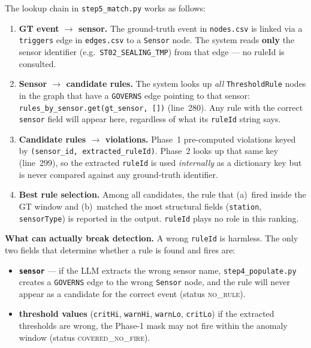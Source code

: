 ﻿\documentclass[11pt]{article}
\begin{document}
The lookup chain in \texttt{step5\_match.py} works as follows:
\begin{enumerate}[leftmargin=1.5em,itemsep=2pt]

  \item \textbf{GT event $\to$ sensor.}
    The ground-truth event in \texttt{nodes.csv} is linked via a
    \texttt{triggers} edge in \texttt{edges.csv} to a \texttt{Sensor}
    node.  The system reads \textbf{only} the sensor identifier
    (e.g.\ \texttt{ST02\_SEALING\_TMP}) from that edge — no ruleId is
    consulted.

  \item \textbf{Sensor $\to$ candidate rules.}
    The system looks up \emph{all} \texttt{ThresholdRule} nodes in the
    graph that have a \texttt{GOVERNS} edge pointing to that sensor:
    \verb|rules_by_sensor.get(gt_sensor, [])| (line~280).
    Any rule with the correct \texttt{sensor} field will appear here,
    regardless of what its \texttt{ruleId} string says.

  \item \textbf{Candidate rules $\to$ violations.}
    Phase~1 pre-computed violations keyed by
    \texttt{(sensor\_id, extracted\_ruleId)}.  Phase~2 looks up that
    same key (line~299), so the extracted \texttt{ruleId} is used
    \emph{internally} as a dictionary key but is never compared against
    any ground-truth identifier.

  \item \textbf{Best rule selection.}
    Among all candidates, the rule that (a)~fired inside the GT window
    and (b)~matched the most structural fields
    (\texttt{station}, \texttt{sensorType}) is reported in the output.
    \texttt{ruleId} plays no role in this ranking.

\end{enumerate}

\noindent
\textbf{What can actually break detection.}
A wrong \texttt{ruleId} is harmless.
The only two fields that determine whether a rule is found and fires are:
\begin{itemize}[leftmargin=1.5em,itemsep=1pt]
  \item \textbf{\texttt{sensor}} — if the LLM extracts the wrong sensor
    name, \texttt{step4\_populate.py} creates a \texttt{GOVERNS} edge to
    the wrong \texttt{Sensor} node, and the rule will never appear as a
    candidate for the correct event (status \textsc{no\_rule}).
  \item \textbf{threshold values} (\texttt{critHi}, \texttt{warnHi},
    \texttt{warnLo}, \texttt{critLo}) if the extracted thresholds are
    wrong, the Phase-1 mask may not fire within the anomaly window
    (status \textsc{covered\_no\_fire}).
\end{itemize}
\end{document}

